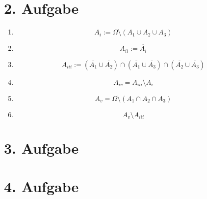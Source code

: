 \documentclass[10pt,a4paper,parskip=half]{scrartcl}
\begin{document}
\section*{2. Aufgabe}
\begin{enumerate}[\quad(i)]
	\item $$ A_i :=  \Omega \setminus (A_1 \cup A_2 \cup A_3)$$
	\item $$ A_{ii} := \overline{A_i} $$
	\item $$ A_{iii} :=  (\overline{A_1} \cup \overline{A_2}) \cap (\overline{A_1} \cup \overline{A_3}) \cap (\overline{A_2} \cup \overline{A_3}) $$
	\item $$A_{iv} = A_{iii} \setminus  A_i $$
	\item $$ A_{v} = \Omega \setminus (A_1 \cap A_2 \cap A_3) $$
	\item $$ A_v \setminus A_{iii} $$
\end{enumerate}
\section*{3. Aufgabe}
\section*{4. Aufgabe}
\end{document}
